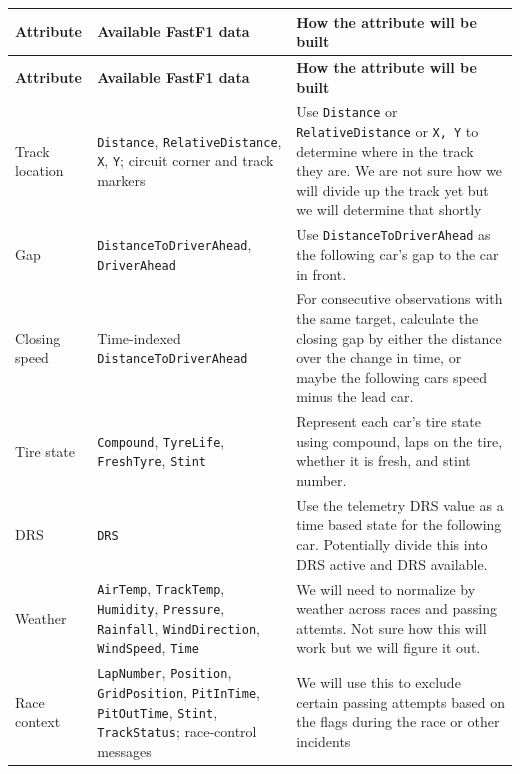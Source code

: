 \documentclass{article}
\begin{document}
\begin{longtable}{|p{}|p{}|p{}|}
\hline
\textbf{Attribute} & \textbf{Available FastF1 data} & \textbf{How the attribute will be built} \\
\hline
\endfirsthead

\hline
\textbf{Attribute} & \textbf{Available FastF1 data} & \textbf{How the attribute will be built} \\
\hline
\endhead

Track location &
\texttt{Distance}, \texttt{RelativeDistance}, \texttt{X}, \texttt{Y};
circuit corner and track markers &
Use \texttt{Distance} or \texttt{RelativeDistance} or \texttt{X, Y} to determine where in the track they are. We are not sure how we will divide up the track yet but we will determine that shortly \\ \hline

Gap &
\texttt{DistanceToDriverAhead}, \texttt{DriverAhead} &
Use \texttt{DistanceToDriverAhead} as the following car's gap to the car in front. \\ \hline

Closing speed &
Time-indexed \texttt{DistanceToDriverAhead} &
For consecutive observations with the same target, calculate the closing gap by either the distance over the change in time, or maybe the following cars speed minus the lead car. \\ \hline

Tire state &
\texttt{Compound}, \texttt{TyreLife}, \texttt{FreshTyre}, \texttt{Stint} &
Represent each car's tire state using compound, laps on the tire, whether it is fresh, and stint number. \\ \hline

DRS &
\texttt{DRS} &
Use the telemetry DRS value as a time based state for the following car. Potentially divide this into DRS active and DRS available. \\ \hline

Weather &
\texttt{AirTemp}, \texttt{TrackTemp}, \texttt{Humidity}, \texttt{Pressure}, \texttt{Rainfall}, \texttt{WindDirection}, \texttt{WindSpeed}, \texttt{Time} &
We will need to normalize by weather across races and passing attemts. Not sure how this will work but we will figure it out. \\ \hline

Race context &
\texttt{LapNumber}, \texttt{Position}, \texttt{GridPosition}, \texttt{PitInTime}, \texttt{PitOutTime}, \texttt{Stint}, \texttt{TrackStatus}; race-control messages &
We will use this to exclude certain passing attempts based on the flags during the race or other incidents \\ \hline

\end{longtable}
\end{document}
